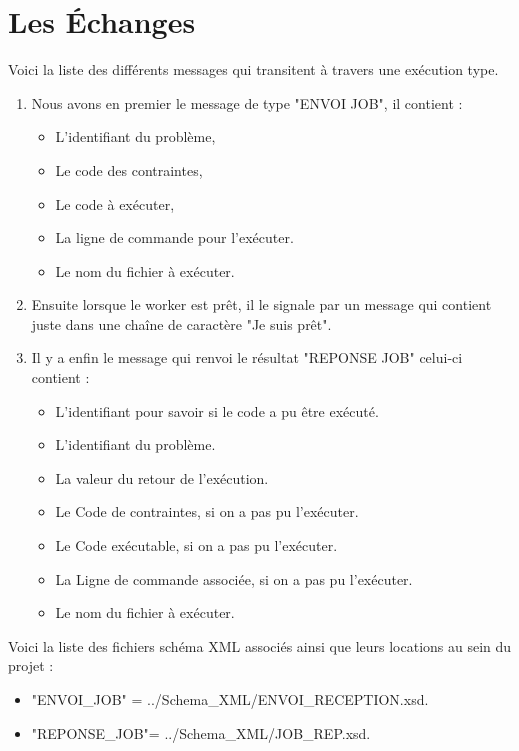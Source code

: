 \documentclass[11pt]{article}
\begin{document}
\section{Les Échanges} 
Voici la liste des différents messages qui transitent à travers une exécution type.

 
\begin{enumerate} \item Nous avons en premier le message de type "ENVOI JOB", il contient :
\begin{itemize}
\item L'identifiant du problème,
\item Le code des contraintes,
\item Le code à exécuter,
\item La ligne de  commande pour l\textquoteright exécuter.
\item Le nom du fichier à exécuter.
\end{itemize}

\item Ensuite lorsque le worker est prêt, il le signale par un message qui contient juste dans une chaîne de caractère "Je suis prêt".
\item Il y a enfin le message qui renvoi le résultat "REPONSE JOB" celui-ci contient : 
\begin{itemize}
\item L'identifiant pour savoir si le code a pu être exécuté.
\item L'identifiant du problème.
\item La valeur du retour de l\textquoteright exécution.
\item Le Code de contraintes, si on a pas pu l'exécuter.
\item Le Code exécutable, si on a pas pu l'exécuter.
\item La Ligne de commande associée, si on a pas pu l'exécuter.
\item Le nom du fichier à exécuter.
\end{itemize}
\end{enumerate}
Voici la liste des fichiers schéma XML associés ainsi que leurs locations au sein du projet :
\begin{itemize}	
\item "ENVOI\_JOB" = ../Schema\_XML/ENVOI\_RECEPTION.xsd.
\item "REPONSE\_JOB"= ../Schema\_XML/JOB\_REP.xsd.

\end{itemize}
\end{document}
